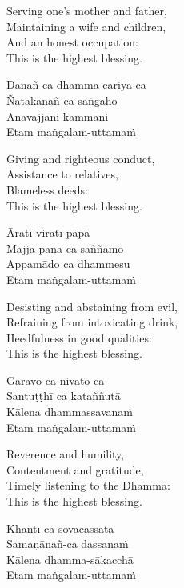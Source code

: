 \begin{english}
  Serving one’s mother and father,\\
  Maintaining a wife and children,\\
  And an honest occupation:\\
  This is the highest blessing.
\end{english}

Dānañ-ca dhamma-cariyā ca\\
Ñātakānañ-ca saṅgaho\\
Anavajjāni kammāni\\
Etam maṅgalam-uttamaṁ

\begin{english}
  Giving and righteous conduct,\\
  Assistance to relatives,\\
  Blameless deeds:\\
  This is the highest blessing.
\end{english}

Āratī viratī pāpā\\
Majja-pānā ca saññamo\\
Appamādo ca dhammesu\\
Etam maṅgalam-uttamaṁ

\begin{english}
  Desisting and abstaining from evil,\\
  Refraining from intoxicating drink,\\
  Heedfulness in good qualities:\\
  This is the highest blessing.
\end{english}

Gāravo ca nivāto ca\\
Santuṭṭhī ca kataññutā\\
Kālena dhammassavanaṁ\\
Etam maṅgalam-uttamaṁ

\begin{english}
  Reverence and humility,\\
  Contentment and gratitude,\\
  Timely listening to the Dhamma:\\
  This is the highest blessing.
\end{english}

Khantī ca sovacassatā\\
Samaṇānañ-ca dassanaṁ\\
Kālena dhamma-sākacchā\\
Etam maṅgalam-uttamaṁ

